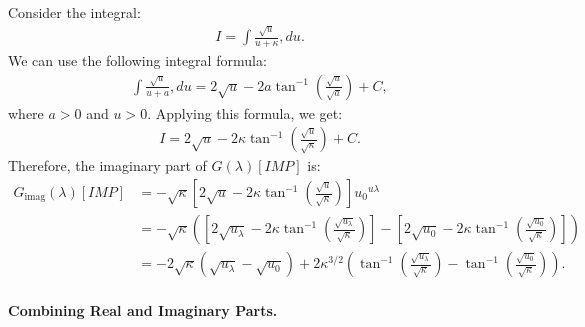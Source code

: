 Consider the integral:
\begin{align}
I = \int \frac{ \sqrt{ u } }{ u + \kappa } , du.
\end{align}
%
We can use the following integral formula:
\begin{align}
\int \frac{ \sqrt{ u } }{ u + a } , du = 2 \sqrt{ u } - 2 a \tan^{-1} \left( \frac{ \sqrt{ u } }{ \sqrt{ a } } \right ) + C,
\end{align}
where $a > 0$ and $u > 0$.
%
Applying this formula, we get:
\begin{align}
I = 2 \sqrt{ u } - 2 \kappa \tan^{-1} \left( \frac{ \sqrt{ u } }{ \sqrt{ \kappa } } \right ) + C.
\end{align}
%
Therefore, the imaginary part of $G(\lambda)[IMP]$ is:
\begin{align}
\nonumber
G_{\text{imag}}(\lambda)[IMP] 
   &= - \sqrt{ \kappa } \left[ 2 \sqrt{ u } - 2 \kappa \tan^{-1} \left( \frac{ \sqrt{ u } }{ \sqrt{ \kappa } } \right ) \right ]{u_0}^{u\lambda} \\
\nonumber
   &= - \sqrt{ \kappa } \left( \left[ 2 \sqrt{ u_\lambda } - 2 \kappa \tan^{-1} \left( \frac{ \sqrt{ u_\lambda } }{ \sqrt{ \kappa } } \right ) \right ] - \left[ 2 \sqrt{ u_0 } - 2 \kappa \tan^{-1} \left( \frac{ \sqrt{ u_0 } }{ \sqrt{ \kappa } } \right ) \right ] \right ) \\
   &= - 2 \sqrt{ \kappa } \left( \sqrt{ u_\lambda } - \sqrt{ u_0 } \right ) + 2 \kappa^{ 3/2 } \left( \tan^{-1} \left( \frac{ \sqrt{ u_\lambda } }{ \sqrt{ \kappa } } \right ) - \tan^{-1} \left( \frac{ \sqrt{ u_0 } }{ \sqrt{ \kappa } } \right ) \right ).
\end{align}


\paragraph{Combining Real and Imaginary Parts.}

